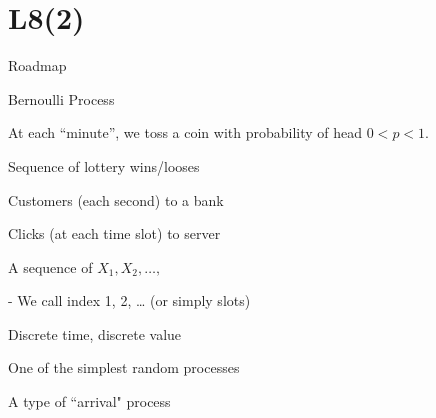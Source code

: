 \section{L8(2)}
\begin{frame}{Roadmap}

\plitemsep 0.2in

\bce[(1)]

\item {}
\item {}

  \item {}

\ece

\end{frame}

\begin{frame}{Bernoulli Process}

\plitemsep 0.05in
\bci

\item<1-> At each ``minute'', we toss a coin with probability of head $0<p<1.$

\bci
\item<2-> Sequence of lottery wins/looses
\item<2-> Customers (each second) to a bank
\item<2-> Clicks (at each time slot) to server
\eci


\item<3-> A sequence of  $X_1, X_2, \ldots, $

- We call index 1, 2, \ldots {} (or simply slots)


\item<4-> Discrete time, discrete value

\item<5-> One of the simplest random processes

\item<5-> A type of ``arrival" process

  
\eci

\end{frame}

